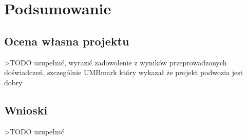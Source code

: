 \chapter{Podsumowanie}
\section{Ocena własna projektu}
>TODO uzupełnić, wyrazić zadowolenie z wyników przeprowadzonych doświadczeń, szczególnie UMBmark który wykazał że projekt podwozia jest dobry

\section{Wnioski}
>TODO uzupełnić